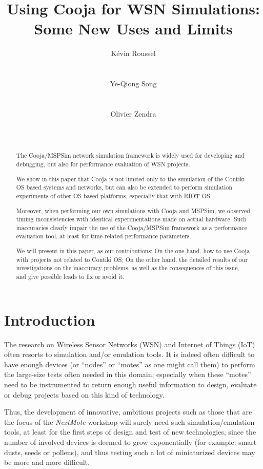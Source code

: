 \documentclass[10pt,emptycopyrightspace]{ewsn-proc}
\author{
\alignauthor K\'evin Roussel \\
        \affaddr{INRIA Nancy Grand-Est}\\
        \affaddr{615, rue du Jardin Botanique}\\
        \affaddr{54600 Villers-l\`es-Nancy, France}
       \email{kevin.roussel@inria.fr}
\alignauthor Ye-Qiong Song \\
        \affaddr{LORIA/INRIA Nancy Grand-Est}\\
        \affaddr{615, rue du Jardin Botanique}\\
        \affaddr{54600 Villers-l\`es-Nancy, France}
       \email{ye-qiong.song@loria.fr}
\alignauthor Olivier Zendra \\
        \affaddr{INRIA Nancy Grand-Est}\\
        \affaddr{615, rue du Jardin Botanique}\\
        \affaddr{54600 Villers-l\`es-Nancy, France}
       \email{olivier.zendra@inria.fr}
}
\title{Using Cooja for WSN Simulations: Some New Uses and Limits}
\begin{document}
\maketitle


\begin{abstract}
The Cooja/MSPSim network simulation framework is widely used for developing
and debugging, but also for performance evaluation of WSN projects.

We show in this paper that Cooja is not limited only to the simulation
of the Contiki OS based systems and networks, but can also be extended 
to perform simulation experiments of other OS based platforms, especially
that with RIOT OS.

Moreover, when performing our own simulations with Cooja and MSPSim,
we observed timing inconsistencies with identical experimentations made
on actual hardware. Such inaccuracies clearly impair the use of the
Cooja/MSPSim framework as a performance evaluation tool, at least
for time-related performance parameters.

We will present in this paper, as our contributions: On the one hand,
how to use Cooja with projects not related to Contiki OS;
On the other hand, the detailed results of our investigations on the
inaccuracy problems, as well as the consequences of this issue, and give
possible leads to fix or avoid it.
\end{abstract}

\medskip


\section{Introduction}
\label{introduction}

The research on Wireless Sensor Networks (WSN) and Internet of Things (IoT)
often resorts to simulation and/or emulation tools. It is indeed often
difficult to have enough devices (or ``nodes'' or ``motes'' as one might
call them) to perform the large-size tests often needed in this domain;
especially when these ``motes'' need to be instrumented to return enough
useful information to design, evaluate or debug projects based on this
kind of technology.

Thus, the development of innovative, ambitious projects such as those
that are the focus of the \emph{NextMote} workshop will surely need
such simulation/emulation tools, at least for the first steps of design
and test of new technologies, since the number of involved devices is
deemed to grow exponentially (for example: smart dusts, seeds or pollens),
and thus testing such a lot of miniaturized devices may be more and more
difficult.
\end{document}
